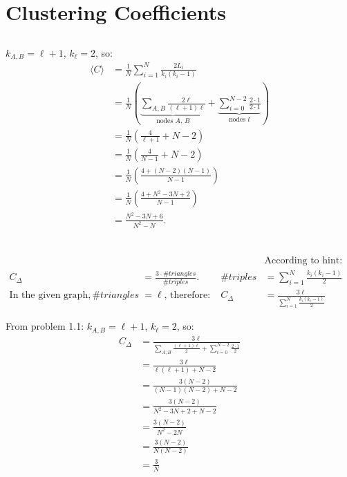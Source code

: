 \documentclass {article}
\begin{document}
\section{Clustering Coefficients}
\subsection{}

 $ k_{A, B} = \ell + 1$,    $k_{\ell} = 2 $, so:
\begin{align*}
 \langle C \rangle& =  \frac{ 1 }{ N } \sum\limits_{ i=1 }^N \frac{ 2 L_i }{ k_i (k_i - 1) } \\
& =  \frac{ 1 }{ N } \left( \underbrace{\sum\limits_{ A,B } \frac{ 2 \ell }{ (\ell + 1) \ell }}_\text{nodes $A$, $B$}   +   \underbrace{ \sum\limits_{ i=0 }^{N-2} \frac{ 2 \cdot 1 }{ 2 \cdot 1 }}_\text{nodes $l$} \right) \\
& =  \frac{ 1 }{ N } \left( \frac{ 4 }{ \ell + 1 } + N - 2  \right) \\
& =  \frac{ 1 }{ N } \left( \frac{ 4 }{ N - 1 } + N - 2  \right) \\
& =  \frac{ 1 }{ N } \left( \frac{ 4 + (N - 2)(N - 1) }{ N - 1 } \right) \\
& =  \frac{ 1 }{ N } \left( \frac{ 4 + N^2 - 3N + 2 }{ N - 1 }  \right) \\
& =  \frac{ N^2 - 3N + 6 }{ N^2 - N }. \\
\end{align*}

\subsection{}
\begin{align*}
& & &\text{According to hint:}\\
 C_{\Delta} &= \frac{ 3 \cdot \# triangles }{ \# triples }. & \# triples &= \sum\limits_{ i=1 }^N \frac{ k_i (k_i - 1) }{ 2 }\\
\text{In the given graph},  \# triangles &= \ell  \text{, therefore: }  & C_{\Delta} &=  \frac{ 3 \ell }{ \sum\limits_{ i=1 }^N \frac{ k_i (k_i - 1) }{ 2 }}& 
 \end{align*}
 
From problem 1.1: $ k_{A, B} = \ell + 1$,    $k_{\ell} = 2 $, so:
\begin{align*}
 C_{\Delta} &=   \frac{ 3 \ell }{ \sum\limits_{ A,B} \frac{ (\ell + 1) \ell }{ 2 } + \sum\limits_{ i=0 }^{N-2} \frac{ 2 \cdot 1 }{ 2 }} \\
& =\frac{ 3 \ell }{ \ell (\ell + 1) + N - 2 } \\
& = \frac{ 3 (N - 2) }{ (N-1)(N-2) + N - 2 } \\
& = \frac{ 3 (N - 2) }{ N^2 - 3N + 2 + N - 2 } \\
& = \frac{ 3 (N - 2) }{ N^2 - 2N } \\
& = \frac{ 3 (N - 2) }{ N (N - 2) } \\
& = \frac{ 3 }{ N } \\
\end{align*}
\end{document}
